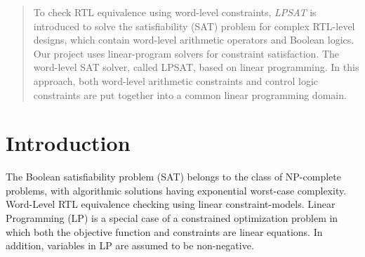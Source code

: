 \documentclass[conference,11pt]{IEEEtran}
\begin{document}




\maketitle







%
\IEEEpeerreviewmaketitle

\begin{abstract}
To check RTL equivalence using word-level constraints,\emph{ LPSAT} is introduced to solve the satisfiability (SAT) problem for complex RTL-level
designs, which contain word-level arithmetic operators and Boolean logics. Our project uses linear-program solvers for constraint satisfaction.
The word-level SAT solver, called LPSAT, based on linear programming. In this approach, both word-level arithmetic constraints and control logic constraints are put together into a common linear programming domain.
\end{abstract}


\section{Introduction}
The Boolean satisfiability problem (SAT) belongs to the class of NP-complete problems, with algorithmic solutions having exponential worst-case complexity. Word-Level RTL equivalence checking using linear constraint-models. Linear Programming (LP) is a special case of a constrained optimization problem in which both the objective function and constraints are linear equations. In addition, variables in LP are assumed to be non-negative.
\end{document}
